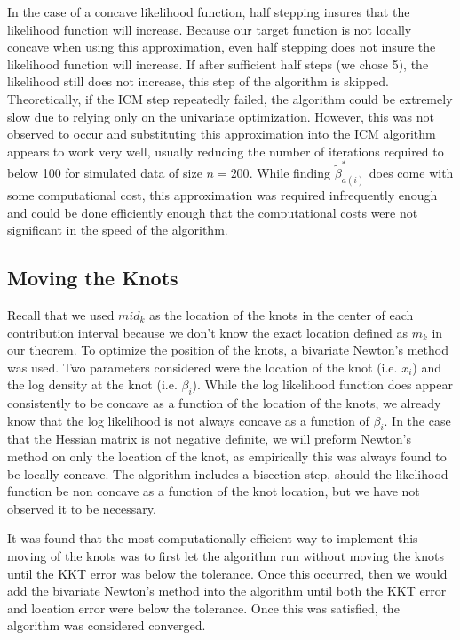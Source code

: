\documentclass[12pt]{article}
\numberwithin{equation}{section}
\begin{document}
	In the case of a concave likelihood function, half stepping insures that the likelihood function will increase. Because our target function is not locally concave when using this approximation, even half stepping does not insure the likelihood function will increase. If after sufficient half steps (we chose 5), the likelihood still does not increase, this step of the algorithm is skipped. Theoretically, if the ICM step repeatedly failed, the algorithm could be extremely slow due to relying only on the univariate optimization. However, this was not observed to occur and substituting this approximation into the ICM algorithm appears to work very well, usually reducing the number of iterations required to below 100 for simulated data of size $n = 200$. While finding  $\tilde \beta^*_{a(i)}$ does come with some computational cost, this approximation was required infrequently enough and could be done efficiently enough that the computational costs were not significant in the speed of the algorithm. 
	
		{\subsection{Moving the Knots} } 
	
	Recall that we used $mid_k$ as the location of the knots in the center of each contribution interval because we don't know the exact location defined as $m_k$ in our theorem. To optimize the position of the knots, a bivariate Newton's method was used. Two parameters considered were the location of the knot (i.e. $x_i$) and the log density at the knot (i.e. $\beta_i$). While the log likelihood function does appear consistently to be concave as a function of the location of the knots, we already know that the log likelihood is not always concave as a function of $\beta_i$. In the case that the Hessian matrix is not negative definite, we will preform Newton's method on only the location of the knot, as empirically this was always found to be locally concave. The algorithm includes a bisection step, should the likelihood function be non concave as a function of the knot location, but we have not observed it to be necessary. 
	
	It was found that the most computationally efficient way to implement this moving of the knots was to first let the algorithm run without moving the knots until the KKT error was below the tolerance. Once this occurred, then we would add the bivariate Newton's method into the algorithm until both the KKT error and location error were below the tolerance. Once this was satisfied, the algorithm was considered converged. 
	
\end{document}
